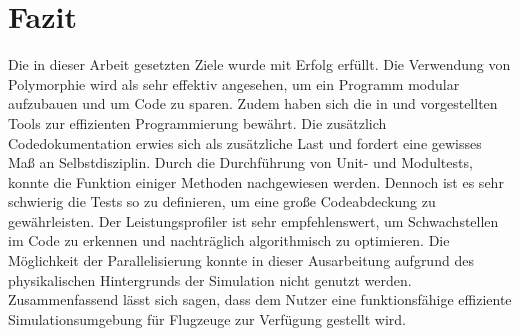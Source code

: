 \section{Fazit}
Die in dieser Arbeit gesetzten Ziele wurde mit Erfolg erfüllt. Die Verwendung von Polymorphie wird als sehr effektiv angesehen, um ein Programm modular aufzubauen und um Code zu sparen. Zudem haben sich die in \cite{Kessler.Sommersemester2017}  und \cite{Kessler.Wintersemester201718} vorgestellten Tools zur effizienten Programmierung bewährt. Die zusätzlich Codedokumentation erwies sich als zusätzliche Last und fordert eine gewisses Maß an Selbstdisziplin. Durch die Durchführung von Unit- und Modultests, konnte die Funktion einiger Methoden nachgewiesen werden. Dennoch ist es sehr schwierig die Tests so zu definieren, um eine große Codeabdeckung zu gewährleisten. Der Leistungsprofiler ist sehr empfehlenswert, um Schwachstellen im Code zu erkennen und nachträglich algorithmisch zu optimieren. Die Möglichkeit der Parallelisierung konnte in dieser Ausarbeitung aufgrund des physikalischen Hintergrunds der Simulation nicht genutzt werden. Zusammenfassend lässt sich sagen, dass dem Nutzer eine funktionsfähige effiziente Simulationsumgebung für Flugzeuge zur Verfügung gestellt wird. 


